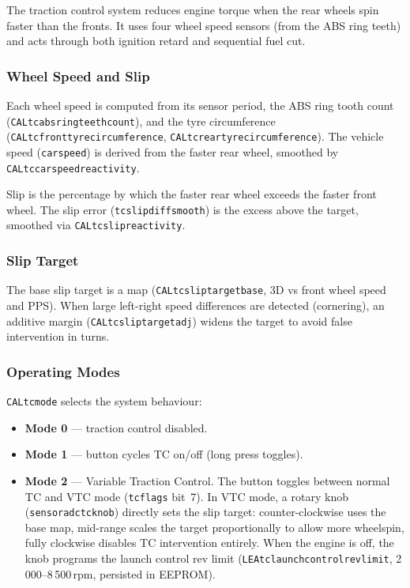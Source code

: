 \documentclass[a4paper,11pt]{article}
\renewcommand{\_}{\oldunderscore\allowbreak}
\begin{document}
The traction control system reduces engine torque when the rear wheels spin
faster than the fronts. It uses four wheel speed sensors (from the ABS ring
teeth) and acts through both ignition retard and sequential fuel cut.

\subsubsection*{Wheel Speed and Slip}

Each wheel speed is computed from its sensor period, the ABS ring tooth count
(\texttt{CAL\_tc\_abs\_ring\_teeth\_count}), and the tyre circumference
(\texttt{CAL\_tc\_front\_tyre\_circumference},
\texttt{CAL\_tc\_rear\_tyre\_circumference}). The vehicle speed
(\texttt{car\_speed}) is derived from the faster rear wheel, smoothed by
\texttt{CAL\_tc\_car\_speed\_reactivity}.

Slip is the percentage by which the faster rear wheel exceeds the faster front
wheel. The slip error (\texttt{tc\_slip\_diff\_smooth}) is the excess above the
target, smoothed via \texttt{CAL\_tc\_slip\_reactivity}.

\subsubsection*{Slip Target}

The base slip target is a map (\texttt{CAL\_tc\_slip\_target\_base},
3D vs front wheel speed and PPS). When large left-right speed
differences are detected (cornering), an additive margin
(\texttt{CAL\_tc\_slip\_target\_adj}) widens the target to avoid false
intervention in turns.

\subsubsection*{Operating Modes}

\texttt{CAL\_tc\_mode} selects the system behaviour:
\begin{itemize}
\item \textbf{Mode 0} --- traction control disabled.
\item \textbf{Mode 1} --- button cycles TC on/off (long press toggles).
\item \textbf{Mode 2} --- Variable Traction Control. The button toggles
      between normal TC and VTC mode (\texttt{tc\_flags} bit~7). In VTC
      mode, a rotary knob (\texttt{sensor\_adc\_tc\_knob}) directly sets
      the slip target: counter-clockwise uses the base map, mid-range scales
      the target proportionally to allow more wheelspin, fully clockwise
      disables TC intervention entirely. When the engine is off, the
      knob programs the launch control rev limit
      (\texttt{LEA\_tc\_launchcontrol\_revlimit}, 2\,000--8\,500\,rpm,
      persisted in EEPROM).
\end{itemize}
\end{document}
